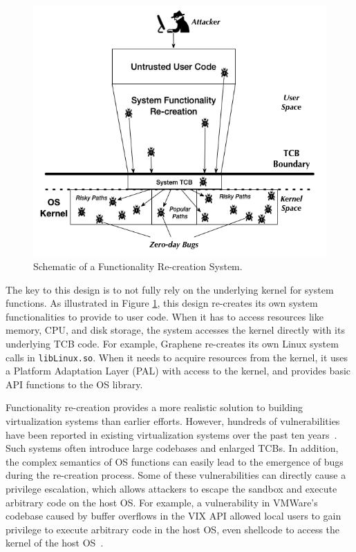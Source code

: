 \begin{figure}%
\centering
\includegraphics[width=1.0\columnwidth]{diagram/Virtualization_Design_Model_02.png}
\caption{\small Schematic of a Functionality Re-creation System.}
\label{fig:design_functionality_reimplementation}
\end{figure}

The key to this design is to not fully rely on the underlying
kernel for system functions. As illustrated in Figure \ref{fig:design_functionality_reimplementation},
this design re-creates its own system functionalities to provide to user code.
When it has to %
access resources like memory, CPU, and disk storage, the system accesses the kernel directly with
its underlying TCB code.
For example, Graphene \cite{Graphene-14} re-creates
its own Linux system calls in
\texttt{libLinux.so}. When it needs to acquire resources from
the kernel, it uses a
Platform Adaptation Layer (PAL) with access to the kernel,
and provides basic API functions to the OS library.

Functionality re-creation provides a more realistic solution to building
virtualization systems than earlier efforts.
However, hundreds of vulnerabilities have been
reported in existing virtualization systems over the past ten years~\cite{NVD}.
Such systems often
introduce large codebases and enlarged TCBs. In addition, the
complex semantics of OS functions can easily lead to the emergence of bugs during
the re-creation process. Some of these vulnerabilities
can directly cause a privilege escalation, which allows attackers to escape the sandbox
and execute arbitrary code on the host OS.
For example, a vulnerability in VMWare's codebase caused by buffer overflows in the VIX
API allowed local users to
gain privilege to execute arbitrary code in the host
OS, even shellcode to access the kernel of the host OS~\cite{CVE-2008-2100}.


